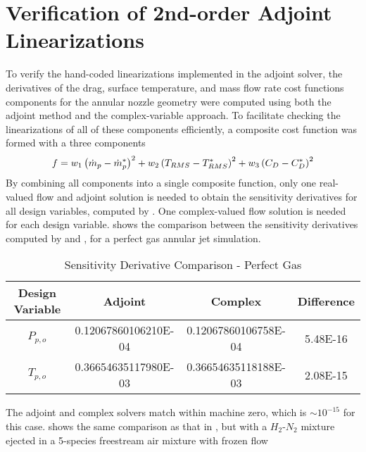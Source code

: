 \section{Verification of 2nd-order Adjoint Linearizations}

To verify the hand-coded linearizations implemented in the adjoint solver, the
derivatives of the drag, surface temperature, and mass flow rate cost functions
components for the annular nozzle geometry were computed using both the adjoint
method and the complex-variable approach.  To facilitate checking the
linearizations of all of these components efficiently, a composite cost function
was formed with a three components
\begin{equation} f = w_1\left( \dot{m}_p - \dot{m}_p^{*}\right)^{2} + w_2\left(
  T_{RMS} - T_{RMS}^*\right)^2 + w_3\left( C_{D} - C_{D}^*\right)^2
  \label{check-cost-func} \end{equation}
By combining all components into a single composite function, only one
real-valued flow and adjoint solution is needed to obtain the sensitivity
derivatives for all design variables, computed by . One
complex-valued flow solution is needed for each design variable.
 shows the comparison between the sensitivity
derivatives computed by  and , for a
perfect gas annular jet simulation.
\begin{table}[h] \centering \begin{tabular}{c|c|c|c} Design Variable & Adjoint &
    Complex & Difference\\ \hline $P_{p,o}$ & 0.12067860106210E-04 &
    0.12067860106758E-04 & 5.48E-16 \\ $T_{p,o}$ & 0.36654635117980E-03 &
    0.36654635118188E-03 & 2.08E-15 \end{tabular} \caption{Sensitivity
  Derivative Comparison - Perfect Gas} \label{tab:pg-deriv-check} \end{table}
The adjoint and complex solvers match within machine zero, which is $\sim
10^{-15}$ for this case.   shows the same
comparison as that in , but with a $H_2$-$N_2$ mixture
ejected in a 5-species freestream air mixture with frozen flow
